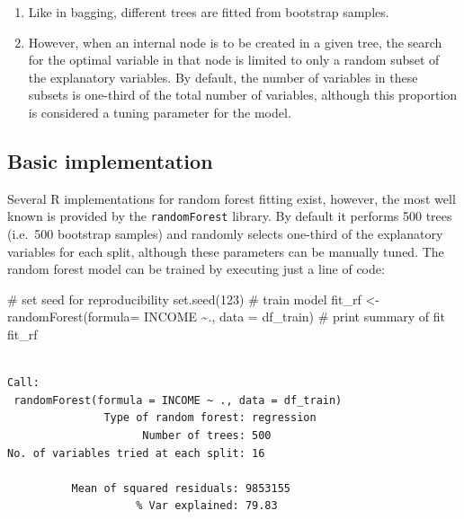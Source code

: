 \documentclass[
  letterpaper,
  DIV=11,
  numbers=noendperiod]{scrreprt}
\newenvironment{Shaded}{\begin{snugshade}}{\end{snugshade}}
\newcommand{\AttributeTok}[1]{\textcolor[rgb]{0.40,0.45,0.13}{#1}}
\newcommand{\CommentTok}[1]{\textcolor[rgb]{0.37,0.37,0.37}{#1}}
\newcommand{\DecValTok}[1]{\textcolor[rgb]{0.68,0.00,0.00}{#1}}
\newcommand{\FunctionTok}[1]{\textcolor[rgb]{0.28,0.35,0.67}{#1}}
\newcommand{\NormalTok}[1]{\textcolor[rgb]{0.00,0.23,0.31}{#1}}
\newcommand{\OtherTok}[1]{\textcolor[rgb]{0.00,0.23,0.31}{#1}}
\newcommand{\SpecialCharTok}[1]{\textcolor[rgb]{0.37,0.37,0.37}{#1}}
\begin{document}
\begin{enumerate}
\def\labelenumi{\arabic{enumi}.}
\item
  Like in bagging, different trees are fitted from bootstrap samples.
\item
  However, when an internal node is to be created in a given tree, the
  search for the optimal variable in that node is limited to only a
  random subset of the explanatory variables. By default, the number of
  variables in these subsets is one-third of the total number of
  variables, although this proportion is considered a tuning parameter
  for the model.
\end{enumerate}

\hypertarget{basic-implementation}{%
\subsection{Basic implementation}\label{basic-implementation}}

Several R implementations for random forest fitting exist, however, the
most well known is provided by the \texttt{randomForest} library. By
default it performs 500 trees (i.e.~500 bootstrap samples) and randomly
selects one-third of the explanatory variables for each split, although
these parameters can be manually tuned. The random forest model can be
trained by executing just a line of code:

\begin{Shaded}
\begin{Highlighting}[]
\CommentTok{\# set seed for reproducibility}
\FunctionTok{set.seed}\NormalTok{(}\DecValTok{123}\NormalTok{)}
\CommentTok{\# train model}
\NormalTok{fit\_rf }\OtherTok{\textless{}{-}} \FunctionTok{randomForest}\NormalTok{(}\AttributeTok{formula=}\NormalTok{ INCOME }\SpecialCharTok{\textasciitilde{}}\NormalTok{., }\AttributeTok{data =}\NormalTok{ df\_train)}
\CommentTok{\# print summary of fit}
\NormalTok{fit\_rf}
\end{Highlighting}
\end{Shaded}

\begin{verbatim}

Call:
 randomForest(formula = INCOME ~ ., data = df_train) 
               Type of random forest: regression
                     Number of trees: 500
No. of variables tried at each split: 16

          Mean of squared residuals: 9853155
                    % Var explained: 79.83
\end{verbatim}
\end{document}
